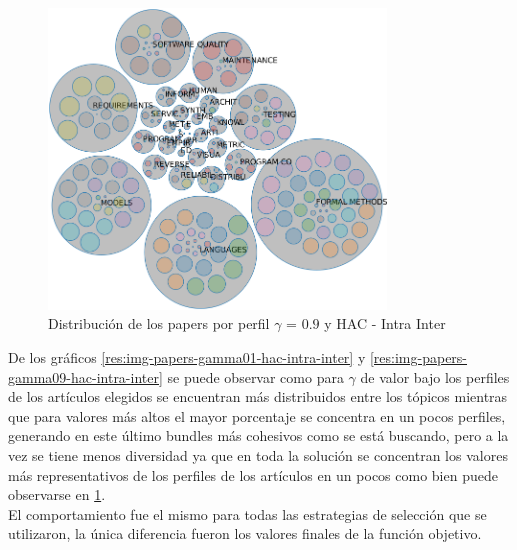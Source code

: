 \begin{figure}[H]
  \centering
    \includegraphics[width=0.8\textwidth]{resultados/papers/HAC/INTRA_INTER/bubbles-gamma-09.png}
  \caption{Distribución de los papers por perfil $\gamma$ = $0.9$ y HAC - Intra Inter}
  \label{res:img-papers-bubbles-gamma09-hac-intra-inter}
\end{figure}

De los gráficos \ref{res:img-papers-gamma01-hac-intra-inter} y \ref{res:img-papers-gamma09-hac-intra-inter} se puede observar como para $\gamma$ de valor bajo los perfiles de los artículos elegidos se encuentran más distribuidos entre los tópicos mientras que para valores más altos el mayor porcentaje se concentra en un pocos perfiles, generando en este último bundles más cohesivos como se está buscando, pero a la vez se tiene menos diversidad ya que en toda la solución se concentran los valores más representativos de los perfiles de los artículos en un pocos como bien puede observarse en \ref{res:img-papers-bubbles-gamma09-hac-intra-inter}.\\
El comportamiento fue el mismo para todas las estrategias de selección que se utilizaron, la única diferencia fueron los valores finales de la función objetivo.
